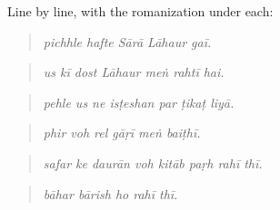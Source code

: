 \begin{tcolorbox}[breakable,skin=enhanced,colback=orange!6,colframe=orange!45!black,boxrule=0.5pt,arc=1mm,left=6pt,right=6pt,top=4pt,bottom=4pt,fonttitle=\bfseries,title={Read this}]
Line by line, with the romanization under each:

\begin{quote}
\textbf{    }
\end{quote}

\begin{quote}
\emph{pichhle hafte Sārā Lāhaur gaī.}
\end{quote}

\begin{quote}
\textbf{      }
\end{quote}

\begin{quote}
\emph{us kī dost Lāhaur meṅ rahtī hai.}
\end{quote}

\begin{quote}
\textbf{      }
\end{quote}

\begin{quote}
\emph{pehle us ne isṭeshan par ṭikaṭ liyā.}
\end{quote}

\begin{quote}
\textbf{     }
\end{quote}

\begin{quote}
\emph{phir voh rel gāṛī meṅ baiṭhī.}
\end{quote}

\begin{quote}
\textbf{       }
\end{quote}

\begin{quote}
\emph{safar ke daurān voh kitāb paṛh rahī thī.}
\end{quote}

\begin{quote}
\textbf{    }
\end{quote}

\begin{quote}
\emph{bāhar bārish ho rahī thī.}
\end{quote}


\end{tcolorbox}
